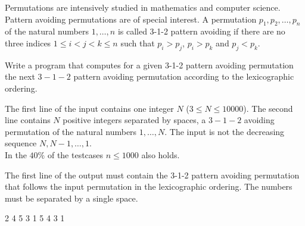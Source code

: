 





Permutations are intensively studied in mathematics and computer science. Pattern avoiding permutations are of special interest. A permutation $p_1,p_2, \ldots, p_n$ of the natural numbers $1,\ldots, n$ is called 3-1-2 pattern avoiding if there are no three indices $1\leq i<j<k \leq n$ such that $p_i>p_j$,  $p_i>p_k$ and $p_j<p_k$.

Write a program that computes for a given 3-1-2 pattern avoiding permutation the next
$3-1-2$ pattern avoiding permutation according to the lexicographic ordering.

The first line of the input contains one integer $N$ ($3 \leq N \leq 10000$). The second line contains $N$ positive integers separated by spaces, a $3-1-2$ avoiding permutation of the natural numbers $1, \ldots, N$. The input is not the decreasing sequence $N,N-1,\ldots ,1$. \\
\bigskip
In the $40\%$ of the testcases  $n \leq 1000$ also holds.

The first line of the output must contain the 3-1-2 pattern avoiding permutation that follows the input permutation in the lexicographic ordering. The numbers must be separated by a single space.


2 4 5 3 1
 5 4 3 1
\sampleCOMMENT

\sampleEND
\bigskip


